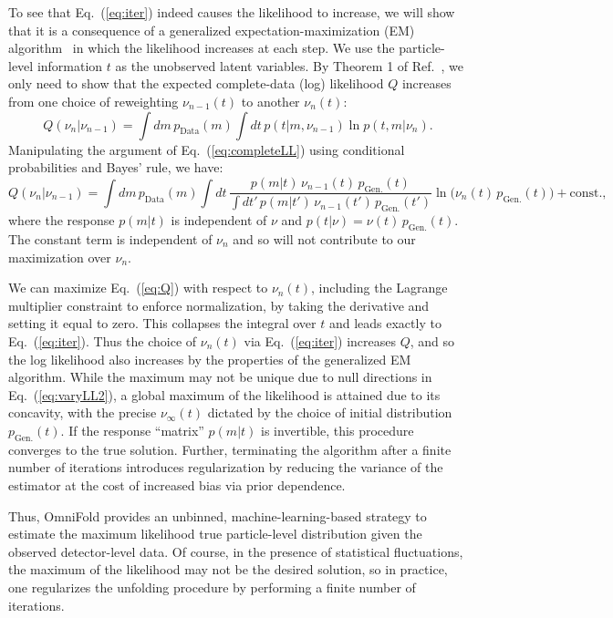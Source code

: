 \documentclass[prl,twocolumn,superscriptaddress,longbibliography,preprintnumbers,nofootinbib]{revtex4-1}
\DeclareRobustCommand{\Eq}[1]{Eq.~(\ref{eq:#1})}
\DeclareRobustCommand{\Ref}[1]{Ref.~\cite{#1}}
\newcommand{\OmniFold}{{\sc OmniFold}\xspace}
\begin{document}
To see that \Eq{iter} indeed causes the likelihood to increase, we will show that it is a consequence of a generalized expectation-maximization (EM) algorithm~\cite{10.2307/2984875,wu1983,doi:10.1080/01621459.1985.10477119,Kuusela2012StatisticalII} in which the likelihood increases at each step.
%
We use the particle-level information $t$ as the unobserved latent variables.
%
By Theorem 1 of \Ref{10.2307/2984875}, we only need to show that the expected complete-data (log) likelihood $Q$ increases from one choice of reweighting $\nu_{n-1}(t)$ to another $\nu_n(t)$:
%
\begin{equation}\label{eq:completeLL}
Q(\nu_n|\nu_{n-1})=\int dm\,p_\text{Data}(m) \int dt\,p(t|m,\nu_{n-1})\ln p(t,m|\nu_n).%
\end{equation}
%
Manipulating the argument of \Eq{completeLL} using conditional probabilities and Bayes' rule, we have:
%
\begin{equation}\label{eq:Q}
Q(\nu_n|\nu_{n-1})=\int dm\,p_\text{Data}(m) \int dt\,\frac{p(m|t) \, \nu_{n-1}(t) \, p_\text{Gen.}(t)}{\int dt'\,p(m|t') \, \nu_{n-1}(t') \, p_\text{Gen.}(t')}\ln\big(\nu_n(t) \, p_\text{Gen.}(t)\big) + \text{const.},%
\end{equation}
%
where the response $p(m|t)$ is independent of $\nu$ and $p(t|\nu) = \nu(t) \, p_\text{Gen.}(t)$.
%
The constant term is independent of $\nu_n$ and so will not contribute to our maximization over $\nu_n$.


We can maximize \Eq{Q} with respect to $\nu_n(t)$, including the Lagrange multiplier constraint to enforce normalization, by taking the derivative and setting it equal to zero.
%
This collapses the integral over $t$ and leads exactly to \Eq{iter}.
%
Thus the choice of $\nu_n(t)$ via \Eq{iter} increases $Q$, and so the log likelihood also increases by the properties of the generalized EM algorithm.
%
While the maximum may not be unique due to null directions in \Eq{varyLL2}, a global maximum of the likelihood is attained due to its concavity, with the precise $\nu_\infty(t)$ dictated by the choice of initial distribution $p_\text{Gen.}(t)$.
%
If the response ``matrix'' $p(m|t)$ is invertible, this procedure converges to the true solution.
%
Further, terminating the algorithm after a finite number of iterations introduces regularization by reducing the variance of the estimator at the cost of increased bias via prior dependence.


Thus, \OmniFold provides an unbinned, machine-learning-based strategy to estimate the maximum likelihood true particle-level distribution given the observed detector-level data.
%
Of course, in the presence of statistical fluctuations, the maximum of the likelihood may not be the desired solution, so in practice, one regularizes the unfolding procedure by performing a finite number of iterations.

\clearpage
\twocolumngrid

\end{document}
